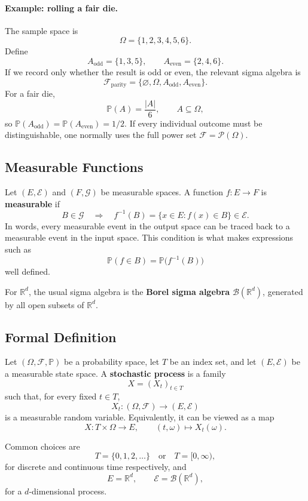 \documentclass[12pt,openany]{book}
\theoremstyle{definition}
\theoremstyle{remark}
\begin{document}
\paragraph{Example: rolling a fair die.}
The sample space is
\[
\Omega=\{1,2,3,4,5,6\}.
\]
Define
\[
A_{\mathrm{odd}}=\{1,3,5\},
\qquad
A_{\mathrm{even}}=\{2,4,6\}.
\]
If we record only whether the result is odd or even, the relevant sigma
algebra is
\[
\mathcal{F}_{\mathrm{parity}}
=\{\varnothing,\Omega,A_{\mathrm{odd}},A_{\mathrm{even}}\}.
\]
For a fair die,
\[
\mathbb{P}(A)=\frac{|A|}{6},
\qquad A\subseteq\Omega,
\]
so \(\mathbb{P}(A_{\mathrm{odd}})=\mathbb{P}(A_{\mathrm{even}})=1/2\).
If every individual outcome must be distinguishable, one normally uses the
full power set \(\mathcal{F}=\mathcal{P}(\Omega)\).

\subsection{Measurable Functions}

Let \((E,\mathcal{E})\) and \((F,\mathcal{G})\) be measurable spaces. A
function \(f:E\to F\) is \textbf{measurable} if
\[
B\in\mathcal{G}
\quad\Longrightarrow\quad
f^{-1}(B)=\{x\in E:f(x)\in B\}\in\mathcal{E}.
\]
In words, every measurable event in the output space can be traced back to a
measurable event in the input space. This condition is what makes expressions
such as
\[
\mathbb{P}(f\in B)
=\mathbb{P}\bigl(f^{-1}(B)\bigr)
\]
well defined.

For \(\mathbb{R}^d\), the usual sigma algebra is the \textbf{Borel sigma
algebra} \(\mathcal{B}(\mathbb{R}^d)\), generated by all open subsets of
\(\mathbb{R}^d\).

\subsection{Formal Definition}

Let \((\Omega,\mathcal{F},\mathbb{P})\) be a probability space, let \(T\) be
an index set, and let \((E,\mathcal{E})\) be a measurable state space. A
\textbf{stochastic process} is a family
\[
X=(X_t)_{t\in T}
\]
such that, for every fixed \(t\in T\),
\[
X_t:(\Omega,\mathcal{F})\longrightarrow(E,\mathcal{E})
\]
is a measurable random variable. Equivalently, it can be viewed as a map
\[
X:T\times\Omega\longrightarrow E,
\qquad
(t,\omega)\longmapsto X_t(\omega).
\]

Common choices are
\[
T=\{0,1,2,\ldots\}
\quad\text{or}\quad
T=[0,\infty),
\]
for discrete and continuous time respectively, and
\[
E=\mathbb{R}^d,
\qquad
\mathcal{E}=\mathcal{B}(\mathbb{R}^d),
\]
for a \(d\)-dimensional process.
\end{document}
